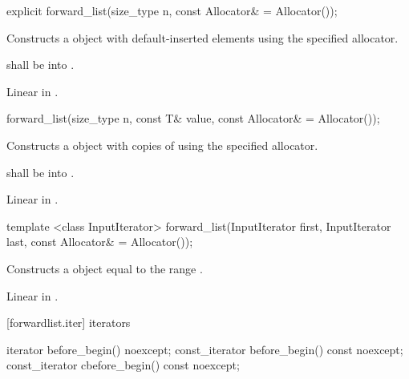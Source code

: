 %
%
\begin{itemdecl}
explicit forward_list(size_type n, const Allocator& = Allocator());
\end{itemdecl}

\begin{itemdescr}
\pnum
\effects Constructs a  object with 
default-inserted elements using the specified allocator.

\pnum
\requires {} shall be  into .

\pnum
\complexity Linear in .
\end{itemdescr}

%
%
\begin{itemdecl}
forward_list(size_type n, const T& value, const Allocator& = Allocator());
\end{itemdecl}

\begin{itemdescr}
\pnum
\effects Constructs a  object with  copies of  using the specified allocator.

\pnum
\requires {} shall be  into .

\pnum
\complexity Linear in .
\end{itemdescr}

%
%
\begin{itemdecl}
template <class InputIterator>
  forward_list(InputIterator first, InputIterator last, const Allocator& = Allocator());
\end{itemdecl}

\begin{itemdescr}
\pnum
\effects Constructs a  object equal to the range .

\pnum
\complexity Linear in .
\end{itemdescr}

[forwardlist.iter]{ iterators}

%
%
%
%
\begin{itemdecl}
iterator before_begin() noexcept;
const_iterator before_begin() const noexcept;
const_iterator cbefore_begin() const noexcept;
\end{itemdecl}

